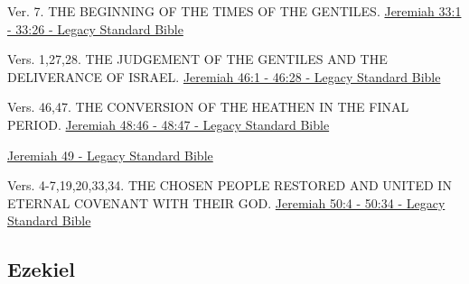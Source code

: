 \documentclass[
  ignorenonframetext,
]{beamer}
\begin{document}
\begin{frame}{39}
\label{section-86}
\begin{block}{Ver. 7. THE BEGINNING OF THE TIMES OF THE GENTILES.}
\label{ver.-7.-the-beginning-of-the-times-of-the-gentiles.}
\href{https://read.lsbible.org/?q=jer33\%3A1-26}{Jeremiah 33:1 - 33:26 -
Legacy Standard Bible}
\end{block}
\end{frame}

\begin{frame}{46}
\label{section-87}
\begin{block}{Vers. 1,27,28. THE JUDGEMENT OF THE GENTILES AND THE
DELIVERANCE OF ISRAEL.}
\label{vers.-12728.-the-judgement-of-the-gentiles-and-the-deliverance-of-israel.}
\href{https://read.lsbible.org/?q=jer46\%3A1-28}{Jeremiah 46:1 - 46:28 -
Legacy Standard Bible}
\end{block}
\end{frame}

\begin{frame}{48}
\label{section-88}
\begin{block}{Vers. 46,47. THE CONVERSION OF THE HEATHEN IN THE FINAL
PERIOD.}
\label{vers.-4647.-the-conversion-of-the-heathen-in-the-final-period.}
\href{https://read.lsbible.org/?q=jer48\%3A46-47}{Jeremiah 48:46 - 48:47
- Legacy Standard Bible}
\end{block}
\end{frame}

\begin{frame}{49}
\label{section-89}
\href{https://read.lsbible.org/?q=jer49}{Jeremiah 49 - Legacy Standard
Bible}
\end{frame}

\begin{frame}{50}
\label{section-90}
\begin{block}{Vers. 4-7,19,20,33,34. THE CHOSEN PEOPLE RESTORED AND
UNITED IN ETERNAL COVENANT WITH THEIR GOD.}
\label{vers.-4-719203334.-the-chosen-people-restored-and-united-in-eternal-covenant-with-their-god.}
\href{https://read.lsbible.org/?q=jer50\%3A4-34}{Jeremiah 50:4 - 50:34 -
Legacy Standard Bible}
\end{block}
\end{frame}

\subsection{Ezekiel}\label{ezekiel}
\end{document}
